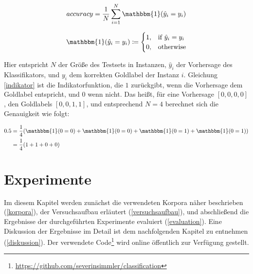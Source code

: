 \begin{equation}
\label{accuracy}
accuracy = \frac{1}{N} \sum\limits_{i=1}^{N} \mathbbm{1}(\hat{y}_{i} = y_{i})
\end{equation}


\begin{equation}
\label{indikator}
\mathbbm{1}(\hat{y}_{i} = y_{i}) \coloneqq 
\begin{cases}
   1, & \text{if}\ \hat{y}_{i} = y_{i} \\
   0, & \text{otherwise}
\end{cases}
\end{equation}

Hier entspricht $N$ der Größe des Testsets in Instanzen, $\hat{y}_{i}$ der Vorhersage des Klassifikators, und $y_{i}$ dem korrekten Goldlabel der Instanz $i$. Gleichung \ref{indikator} ist die Indikatorfunktion, die $1$ zurückgibt, wenn die Vorhersage dem Goldlabel entspricht, und $0$ wenn nicht. Das heißt, für eine Vorhersage $[0, 0, 0, 0]$, den Goldlabels $[0, 0, 1, 1]$, und entsprechend $N = 4$ berechnet sich die Genauigkeit wie folgt:


\begin{equation}
  \label{eq:eqn1}
    \begin{aligned}
      0.5 &= \frac{1}{4} (\mathbbm{1}(0 = 0) + \mathbbm{1}(0 = 0) + \mathbbm{1}(0 = 1) + \mathbbm{1}(0 = 1))        \\
            &=\frac{1}{4} (1 + 1 + 0 + 0)        
    \end{aligned}
\end{equation}


\chapter{Experimente}
\label{experimente}

Im diesem Kapitel werden zunächst die verwendeten Korpora näher beschrieben (\ref{korpora}), der Versuchsaufbau erläutert (\ref{versuchsaufbau}), und abschließend die Ergebnisse der durchgeführten Experimente evaluiert (\ref{evaluation}). Eine Diskussion der Ergebnisse im Detail ist dem nachfolgenden Kapitel zu entnehmen (\ref{diskussion}). Der verwendete Code\footnote{\url{https://github.com/severinsimmler/classification}} wird online öffentlich zur Verfügung gestellt.


